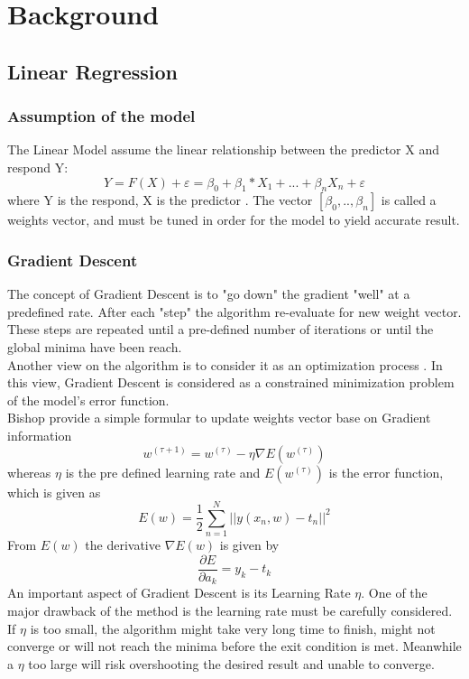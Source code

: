 \documentclass[13pt]{article}
\begin{document}
\section{Background}
\subsection{Linear Regression}
\subsubsection{Assumption of the model}
The Linear Model assume the linear relationship between the predictor X and respond Y:
\begin{equation}
    Y=F(X)+\varepsilon=\beta_0 + \beta_1*X_1 + ... + \beta_n X_n + \varepsilon
\end{equation}
where Y is the respond, X is the predictor \cite{james_introduction_2013}. The vector $[\beta_0, .. , \beta_n]$ is called a weights vector, and must be tuned in order for the model to yield accurate result.
\subsubsection{Gradient Descent}
The concept of Gradient Descent is to "go down" the gradient "well" at a predefined rate. After each "step" the algorithm re-evaluate for new weight vector. These steps are repeated until a pre-defined number of iterations or until the global minima have been reach. \cite{bishop_pattern_2006}\\
Another view on the algorithm is to consider it as an optimization process \cite{lecun_theoretical_1992}. In this view, Gradient Descent is considered as a constrained minimization problem of the model's error function.\\
Bishop \cite[p240]{bishop_pattern_2006} provide a simple formular to update weights vector base on Gradient information
\begin{equation}
w^{(\tau+1)} = w^{(\tau)} - \eta \nabla E (w^{(\tau)})
\end{equation}
whereas $\eta$ is the pre defined learning rate and $E (w^{(\tau)})$ is the error function, which is given as
\begin{equation}
E(w) = \frac{1}{2} \sum_{n=1}^N || y(x_n,w)-t_n||^2
\end{equation}
From $E(w)$ the derivative $\nabla E(w)$ is given by
\begin{equation}
\frac{\partial E}{\partial a_k} = y_k - t_k
\end{equation}
An important aspect of Gradient Descent is its Learning Rate $\eta$. One of the major drawback of the method is the learning rate must be carefully considered. If $\eta$ is too small, the algorithm might take very long time to finish, might not converge or will not reach the minima before the exit condition is met. Meanwhile a $\eta$ too large will risk overshooting the desired result and unable to converge.
\end{document}

